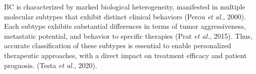 


BC is characterized by marked biological heterogeneity, manifested in multiple molecular subtypes that exhibit distinct 
clinical behaviors \cite{bc_molecular_Perou2000} (Perou \textit{et al.}, 2000). Each subtype exhibits substantial differences in 
terms of tumor aggressiveness, metastatic potential, and behavior to specific therapies 
\cite{bc_subtypes_Prat2015Clinical} (Prat \textit{et al.}, 2015). Thus, accurate classification of these subtypes is essential 
to enable personalized therapeutic approaches, with a direct impact on treatment efficacy and patient prognosis. 
\cite{need_for_subtype_treatments_Testa2020Breast} (Testa \textit{et al.}, 2020).


